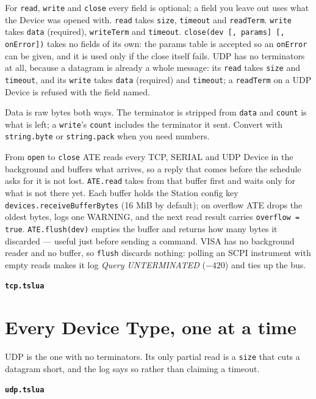 For \texttt{read}, \texttt{write} and \texttt{close} every field is optional; a field you leave
out uses what the Device was opened with. \texttt{read} takes \texttt{size}, \texttt{timeout}
and \texttt{readTerm}. \texttt{write} takes \texttt{data} (required), \texttt{writeTerm} and
\texttt{timeout}. \texttt{close(dev [, params] [, onError])} takes no fields of its own: the
params table is accepted so an \texttt{onError} can be given, and it is used only if the close
itself fails. UDP has no terminators at all, because a datagram is already a whole message:
its \texttt{read} takes \texttt{size} and \texttt{timeout}, and its \texttt{write} takes
\texttt{data} (required) and \texttt{timeout}; a \texttt{readTerm} on a UDP Device is refused
with the field named.

Data is raw bytes both ways. The terminator is stripped from \texttt{data} and \texttt{count} is
what is left; a \texttt{write}'s \texttt{count} includes the terminator it sent. Convert with
\texttt{string.byte} or \texttt{string.pack} when you need numbers.

From \texttt{open} to \texttt{close} ATE reads every TCP, SERIAL and UDP Device in the
background and buffers what arrives, so a reply that comes before the schedule asks for it is
not lost. \texttt{ATE.read} takes from that buffer first and waits only for what is not there
yet. Each buffer holds the Station config key \texttt{devices.receiveBufferBytes} (16 MiB by
default); on overflow ATE drops the oldest bytes, logs one WARNING, and the next read result
carries \texttt{overflow = true}. \texttt{ATE.flush(dev)} empties the buffer and returns how many
bytes it discarded --- useful just before sending a command. VISA has no background reader and no
buffer, so \texttt{flush} discards nothing: polling an SCPI instrument with empty reads makes it
log \emph{Query UNTERMINATED} ($-420$) and ties up the bus.

\noindent\textbf{\texttt{tcp.tslua}}\par


\section{Every Device Type, one at a time}

UDP is the one with no terminators. Its only partial read is a \texttt{size} that cuts a
datagram short, and the log says so rather than claiming a timeout.

\noindent\textbf{\texttt{udp.tslua}}\par


